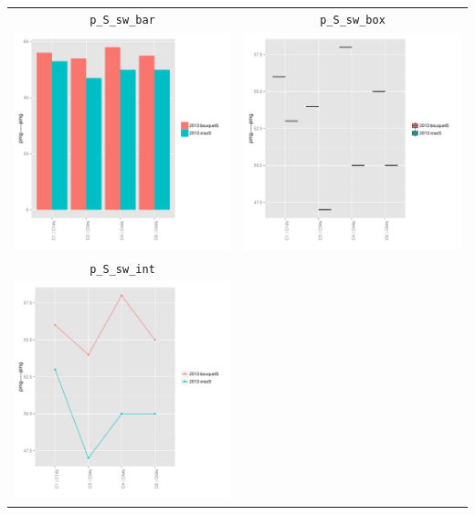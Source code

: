 \documentclass{article}\usepackage[]{graphicx}\usepackage[]{color}
\newenvironment{knitrout}{}{} %
\begin{document}
\begin{center}
\begin{tabular}{cc}
\texttt{p\_S\_sw\_bar} & \texttt{p\_S\_sw\_box} \\
\begin{knitrout}
\definecolor{shadecolor}{rgb}{0.969, 0.969, 0.969}\color{fgcolor}

{\centering \includegraphics[width=.4\textwidth]{figures/shinemas2R_unnamed-chunk-92-1} 

}



\end{knitrout}
&
\begin{knitrout}
\definecolor{shadecolor}{rgb}{0.969, 0.969, 0.969}\color{fgcolor}

{\centering \includegraphics[width=.4\textwidth]{figures/shinemas2R_unnamed-chunk-93-1} 

}



\end{knitrout}
\\
\texttt{p\_S\_sw\_int} & \\
\begin{knitrout}
\definecolor{shadecolor}{rgb}{0.969, 0.969, 0.969}\color{fgcolor}

{\centering \includegraphics[width=.4\textwidth]{figures/shinemas2R_unnamed-chunk-94-1} 

}
\end{knitrout}
\end{tabular}
\end{center}
\end{document}
